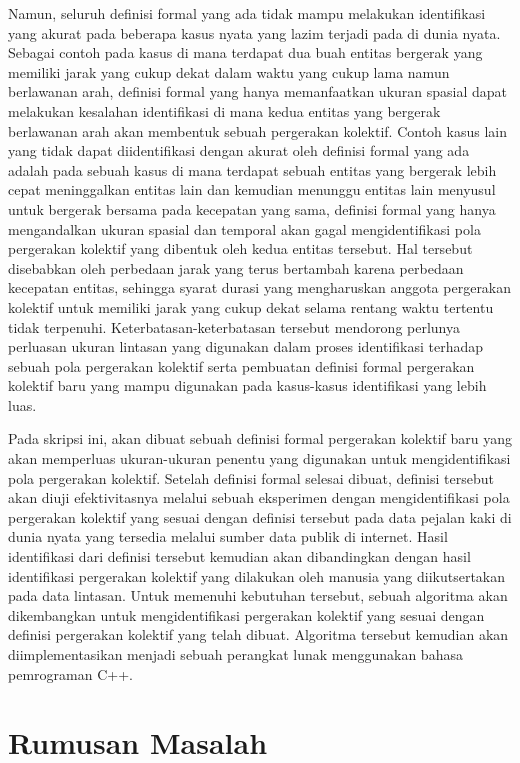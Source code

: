 \documentclass[a4paper,twoside]{article}
\begin{document}
Namun, seluruh definisi formal yang ada tidak mampu melakukan identifikasi yang akurat pada beberapa kasus nyata yang lazim terjadi pada di dunia nyata. Sebagai contoh pada kasus di mana terdapat dua buah entitas bergerak yang memiliki jarak yang cukup dekat dalam waktu yang cukup lama namun berlawanan arah, definisi formal yang hanya memanfaatkan ukuran spasial dapat melakukan kesalahan identifikasi di mana kedua entitas yang bergerak berlawanan arah akan membentuk sebuah pergerakan kolektif. Contoh kasus lain yang tidak dapat diidentifikasi dengan akurat oleh definisi formal yang ada adalah pada sebuah kasus di mana terdapat sebuah entitas yang bergerak lebih cepat meninggalkan entitas lain dan kemudian menunggu entitas lain menyusul untuk bergerak bersama pada kecepatan yang sama, definisi formal yang hanya mengandalkan ukuran spasial dan temporal akan gagal mengidentifikasi pola pergerakan kolektif yang dibentuk oleh kedua entitas tersebut. Hal tersebut disebabkan oleh perbedaan jarak yang terus bertambah karena perbedaan kecepatan entitas, sehingga syarat durasi yang mengharuskan anggota pergerakan kolektif untuk memiliki jarak yang cukup dekat selama rentang waktu tertentu tidak terpenuhi. Keterbatasan-keterbatasan tersebut mendorong perlunya perluasan ukuran lintasan yang digunakan dalam proses identifikasi terhadap sebuah pola pergerakan kolektif serta pembuatan definisi formal pergerakan kolektif baru yang mampu digunakan pada kasus-kasus identifikasi yang lebih luas. 

Pada skripsi ini, akan dibuat sebuah definisi formal pergerakan kolektif baru yang akan memperluas ukuran-ukuran penentu yang digunakan untuk mengidentifikasi pola pergerakan kolektif. Setelah definisi formal selesai dibuat, definisi tersebut akan diuji efektivitasnya melalui sebuah eksperimen dengan mengidentifikasi pola pergerakan kolektif yang sesuai dengan definisi tersebut pada data pejalan kaki di dunia nyata yang tersedia melalui sumber data publik di internet. Hasil identifikasi dari definisi tersebut kemudian akan dibandingkan dengan hasil identifikasi pergerakan kolektif yang dilakukan oleh manusia yang diikutsertakan pada data lintasan. Untuk memenuhi kebutuhan tersebut, sebuah algoritma akan dikembangkan untuk mengidentifikasi pergerakan kolektif yang sesuai dengan definisi pergerakan kolektif yang telah dibuat. Algoritma tersebut kemudian akan diimplementasikan menjadi sebuah perangkat lunak menggunakan bahasa pemrograman C++.

\section{Rumusan Masalah}
\end{document}
